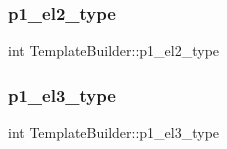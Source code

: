 \subsubsection{\texorpdfstring{p1\+\_\+el2\+\_\+type}{p1\_el2\_type}}
{\footnotesize\ttfamily int Template\+Builder\+::p1\+\_\+el2\+\_\+type}

\hypertarget{class_template_builder_a2f118837472b08c373f968c5b383bb49}{}\label{class_template_builder_a2f118837472b08c373f968c5b383bb49} 
\subsubsection{\texorpdfstring{p1\+\_\+el3\+\_\+type}{p1\_el3\_type}}
{\footnotesize\ttfamily int Template\+Builder\+::p1\+\_\+el3\+\_\+type}

